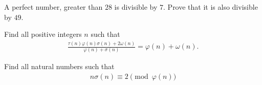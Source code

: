 \documentclass[12pt]{subfile}
\begin{document}
	\begin{problem} %
		A perfect number, greater than $28$ is divisible by $7$. Prove that it is also divisible by $49$.
	\end{problem}

	\begin{problem} %
		Find all positive integers $n$ such that
			\begin{align*}
				\frac{\tau(n)\varphi( n)\sigma(n)+2\omega(n)}{\varphi( n)+\sigma(n)}=\varphi( n)+\omega(n) .
			\end{align*}
	\end{problem}

	\begin{problem}[IMS 2008] %
		Find all natural numbers such that
			\begin{align*}
				n\sigma(n)\equiv 2\pmod {\varphi( n)}
			\end{align*}
	\end{problem}
\end{document}
